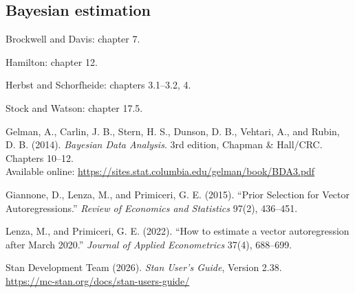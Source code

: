 \documentclass[12pt]{article}
\begin{document}
\subsection{Bayesian estimation}
\begin{description}
\item Brockwell and Davis: chapter 7.
\item Hamilton: chapter 12.
\item[*] Herbst and Schorfheide: chapters 3.1--3.2, 4.
\item Stock and Watson: chapter 17.5.
\item Gelman, A., Carlin, J. B., Stern, H. S., Dunson, D. B., Vehtari, A., and Rubin, D. B. (2014). \emph{Bayesian Data Analysis}. 3rd edition, Chapman \& Hall/CRC. Chapters 10--12. \\ Available online: \url{https://sites.stat.columbia.edu/gelman/book/BDA3.pdf}
\item Giannone, D., Lenza, M., and Primiceri, G. E. (2015). ``Prior Selection for Vector Autoregressions.'' \emph{Review of Economics and Statistics} 97(2), 436--451.
\item Lenza, M., and Primiceri, G. E. (2022). ``How to estimate a vector autoregression after March 2020.'' \emph{Journal of Applied Econometrics} 37(4), 688--699.
\item Stan Development Team (2026). \emph{Stan User's Guide}, Version 2.38. \\ \url{https://mc-stan.org/docs/stan-users-guide/}
\end{description}
\end{document}
